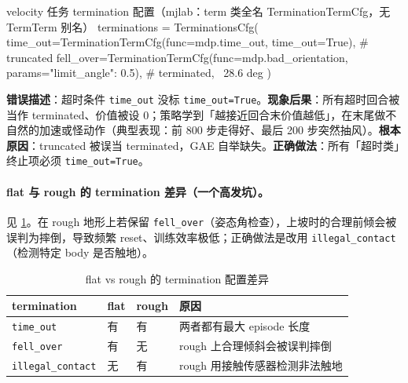 \begin{codebox}[Python]{velocity 任务 termination 配置（mjlab：term 类全名 TerminationTermCfg，无 TermTerm 别名）}
terminations = TerminationsCfg(
    time_out=TerminationTermCfg(func=mdp.time_out, time_out=True),   # truncated
    fell_over=TerminationTermCfg(func=mdp.bad_orientation,
                                 params={"limit_angle": 0.5}),       # terminated, ~28.6 deg
)
\end{codebox}

\begin{pitfall}[忘记给超时项设 time\_out=True]
\textbf{错误描述}：超时条件 \verb|time_out| 没标 \verb|time_out=True|。\textbf{现象后果}：所有超时回合被当作 terminated、价值被设 0；策略学到「越接近回合末价值越低」，在末尾做不自然的加速或怪动作（典型表现：前 800 步走得好、最后 200 步突然抽风）。\textbf{根本原因}：truncated 被误当 terminated，GAE 自举缺失。\textbf{正确做法}：所有「超时类」终止项必须 \verb|time_out=True|。
\end{pitfall}

\paragraph{flat 与 rough 的 termination 差异（一个高发坑）。}见 \cref{tab:rlmc-mgr-flatrough}。在 rough 地形上若保留 \verb|fell_over|（姿态角检查），上坡时的合理前倾会被误判为摔倒，导致频繁 reset、训练效率极低；正确做法是改用 \verb|illegal_contact|（检测特定 body 是否触地）。

\begin{table}[H]
\centering
\caption{flat vs rough 的 termination 配置差异}
\label{tab:rlmc-mgr-flatrough}
\small
\begin{tabular}{@{}llll@{}}
\toprule
termination & flat & rough & 原因 \\
\midrule
\verb|time_out| & 有 & 有 & 两者都有最大 episode 长度 \\
\verb|fell_over| & 有 & 无 & rough 上合理倾斜会被误判摔倒 \\
\verb|illegal_contact| & 无 & 有 & rough 用接触传感器检测非法触地 \\
\bottomrule
\end{tabular}
\end{table}

